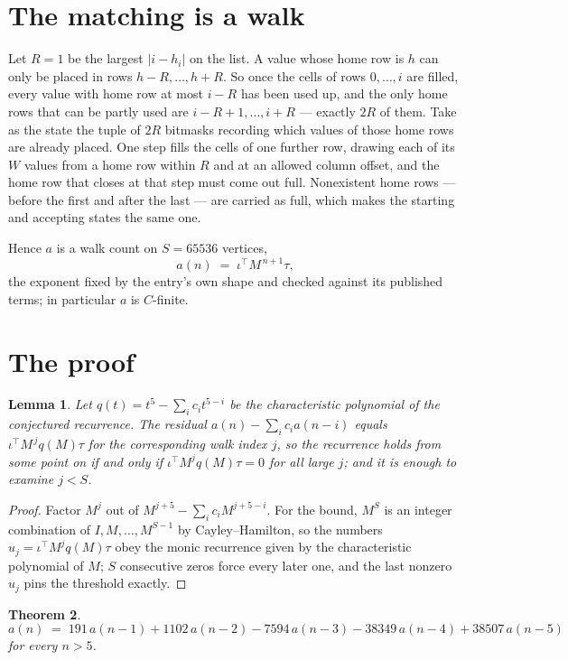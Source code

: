 \documentclass[11pt,a4paper]{article}
\theoremstyle{plain}
\newtheorem{theorem}{Theorem}
\newtheorem{lemma}[theorem]{Lemma}
\theoremstyle{definition}
\begin{document}
\section{The matching is a walk}

Let $R=1$ be the largest $|i-h_i|$ on the list. A value whose home row is $h$ can only be
placed in rows $h-R,\dots,h+R$. So once the cells of rows $0,\dots,i$ are filled, every
value with home row at most $i-R$ has been used up, and the only home rows that can be
partly used are $i-R+1,\dots,i+R$ --- exactly $2R$ of them. Take as the state the tuple of
$2R$ bitmasks recording which values of those home rows are already placed. One step fills
the cells of one further row, drawing each of its $W$ values from a home row within $R$
and at an allowed column offset, and the home row that closes at that step must come out
full. Nonexistent home rows --- before the first and after the last --- are carried as
full, which makes the starting and accepting states the same one.

Hence $a$ is a walk count on $S=65536$ vertices,
\[
a(n)\;=\;\iota^{\!\top}M^{\,n+1}\tau ,
\]
the exponent fixed by the entry's own shape and checked against its published terms; in
particular $a$ is $C$-finite.

\section{The proof}

\begin{lemma}\label{lem:crit}
Let $q(t)=t^{5}-\sum_i c_it^{5-i}$ be the characteristic polynomial of the
conjectured recurrence. The residual $a(n)-\sum_ic_ia(n-i)$ equals
$\iota^{\!\top}M^{\,j}q(M)\tau$ for the corresponding walk index $j$, so the recurrence
holds from some point on if and only if $\iota^{\!\top}M^{j}q(M)\tau=0$ for all large $j$;
and it is enough to examine $j<S$.
\end{lemma}

\begin{proof}
Factor $M^{j}$ out of $M^{j+5}-\sum_ic_iM^{j+5-i}$. For the bound, $M^{S}$
is an integer combination of $I,M,\dots,M^{S-1}$ by Cayley--Hamilton, so the numbers
$u_j=\iota^{\!\top}M^{j}q(M)\tau$ obey the monic recurrence given by the characteristic
polynomial of $M$; $S$ consecutive zeros force every later one, and the last nonzero $u_j$
pins the threshold exactly.
\end{proof}

\begin{theorem}
\[
a(n)\;=\;191\,a(n-1) + 1102\,a(n-2) - 7594\,a(n-3) - 38349\,a(n-4) + 38507\,a(n-5)
\]
for every $n>5$.
\end{theorem}
\end{document}
